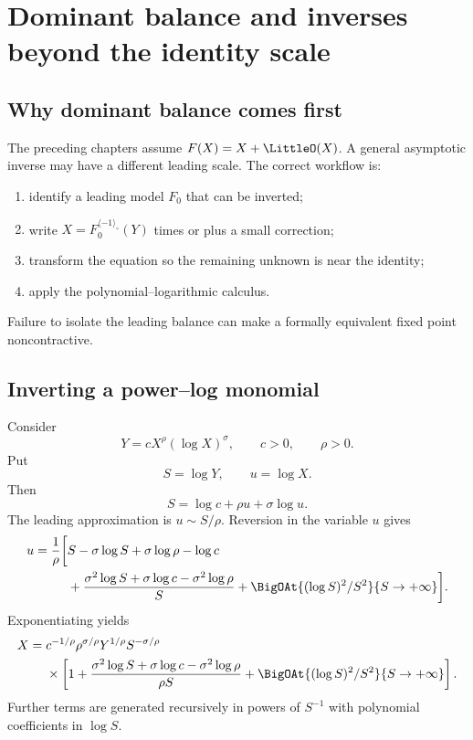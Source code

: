 \documentclass[11pt,oneside]{book}
\theoremstyle{definition}
\theoremstyle{remark}
\newcommand{\compinv}{^{\langle-1\rangle_{\circ}}}
\begin{document}
\chapter{Dominant balance and inverses beyond the identity scale}
\label{ch:reversion-general}

\section{Why dominant balance comes first}
The preceding chapters assume $F(X)=X+\LittleO(X)$.  A general asymptotic inverse may
have a different leading scale.  The correct workflow is:
\begin{enumerate}
\item identify a leading model $F_0$ that can be inverted;
\item write $X=F_0\compinv(Y)$ times or plus a small correction;
\item transform the equation so the remaining unknown is near the identity;
\item apply the polynomial--logarithmic calculus.
\end{enumerate}
Failure to isolate the leading balance can make a formally equivalent fixed
point noncontractive.

\section{Inverting a power--log monomial}
Consider
\begin{equation}\label{eq:power-log-leading}
 Y=cX^\rho(\log X)^\sigma,
 \qquad c>0,
 \qquad \rho>0.
\end{equation}
Put
\[
 S=\log Y,
 \qquad u=\log X.
\]
Then
\begin{equation}\label{eq:power-log-logeq}
 S=\log c+\rho u+\sigma\log u.
\end{equation}
The leading approximation is $u\sim S/\rho$.  Reversion in the variable $u$
gives
\begin{align}\label{eq:u-power-log-inverse}
 u=\frac1\rho\biggl[&S-\sigma\log S+\sigma\log\rho-\log c\\
 &+\frac{\sigma^2\log S+\sigma\log c-\sigma^2\log\rho}{S}
 +\BigOAt{(\log S)^2/S^2}{S\to+\infty}\biggr].\notag
\end{align}
Exponentiating yields
\begin{align}\label{eq:X-power-log-inverse}
 X={}&c^{-1/\rho}\rho^{\sigma/\rho}Y^{1/\rho}
 S^{-\sigma/\rho}\\
 &\times\left[1+
 \frac{\sigma^2\log S+\sigma\log c-\sigma^2\log\rho}
      {\rho S}
 +\BigOAt{(\log S)^2/S^2}{S\to+\infty}\right].\notag
\end{align}
Further terms are generated recursively in powers of $S^{-1}$ with
polynomial coefficients in $\log S$.
\end{document}
